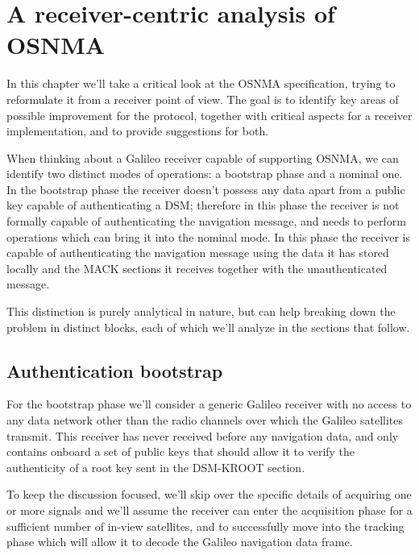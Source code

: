 \chapter{A receiver-centric analysis of OSNMA}

In this chapter we'll take a critical look at the OSNMA specification, trying to
reformulate it from a receiver point of view. The goal is to identify key areas
of possible improvement for the protocol, together with critical aspects for a
receiver implementation, and to provide suggestions for both.

\vspace{\baselineskip}

When thinking about a Galileo receiver capable of supporting OSNMA, we can
identify two distinct modes of operations: a bootstrap phase and a nominal one.
In the bootstrap phase the receiver doesn't possess any data apart from a public
key capable of authenticating a DSM; therefore in this phase the receiver is not
formally capable of authenticating the navigation message, and needs to perform
operations which can bring it into the nominal mode. In this phase the receiver
is capable of authenticating the navigation message using the data it has stored
locally and the MACK sections it receives together with the unauthenticated
message.

This distinction is purely analytical in nature, but can help breaking down the
problem in distinct blocks, each of which we'll analyze in the sections that
follow.

\section{Authentication bootstrap}
For the bootstrap phase we'll consider a generic Galileo receiver with no access
to any data network other than the radio channels over which the Galileo
satellites transmit. This receiver has never received before any navigation
data, and only contains onboard a set of public keys that should allow it to
verify the authenticity of a root key sent in the DSM-KROOT section.

To keep the discussion focused, we'll skip over the specific details of
acquiring one or more signals and we'll assume the receiver can enter the
acquisition phase for a sufficient number of in-view satellites, and to
successfully move into the tracking phase which will allow it to decode the
Galileo navigation data frame.

\vspace{\baselineskip}

